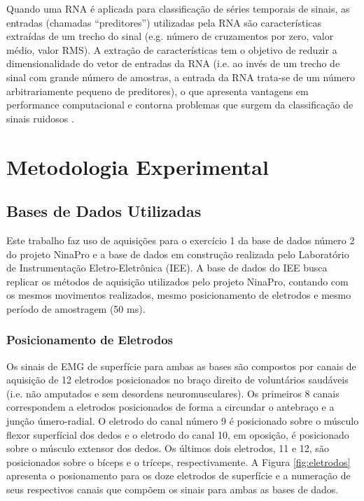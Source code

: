 Quando uma RNA é aplicada para classificação de séries temporais de sinais, as entradas (chamadas ``preditores'') utilizadas pela RNA são características extraídas de um trecho do sinal (e.g. número de cruzamentos por zero, valor médio, valor RMS). A extração de características tem o objetivo de reduzir a dimensionalidade do vetor de entradas da RNA (i.e. ao invés de um trecho de sinal com grande número de amostras, a entrada da RNA trata-se de um número arbitrariamente pequeno de preditores), o que apresenta vantagens em performance computacional e contorna problemas que surgem da classificação de sinais ruidosos \cite{Kim2000}.

	\chapter{Metodologia Experimental}

		\section{Bases de Dados Utilizadas}
Este trabalho faz uso de aquisições para o exercício 1 da base de dados número 2 do projeto NinaPro \cite{Gijsberts2014} e a base de dados em construção realizada pelo Laboratório de Instrumentação Eletro-Eletrônica (IEE). A base de dados do IEE busca replicar os métodos de aquisição utilizados pelo projeto NinaPro, contando com os mesmos movimentos realizados, mesmo posicionamento de eletrodos e mesmo período de amostragem (50 ms).

			\subsection{Posicionamento de Eletrodos}
Os sinais de EMG de superfície para ambas as bases são compostos por canais de aquisição de 12 eletrodos posicionados no braço direito de voluntários saudáveis (i.e. não amputados e sem desordens neuromusculares). Os primeiros 8 canais correspondem a eletrodos posicionados de forma a circundar o antebraço e a junção úmero-radial. O eletrodo do canal número 9 é posicionado sobre o músculo flexor superfícial dos dedos e o eletrodo do canal 10, em oposição, é posicionado sobre o músculo extensor dos dedos. Os últimos dois eletrodos, 11 e 12, são posicionados sobre o bíceps e o tríceps, respectivamente. A Figura \ref{fig:eletrodos} apresenta o posionamento para os doze eletrodos de superfície e a numeração de seus respectivos canais que compõem os sinais para ambas as bases de dados.

